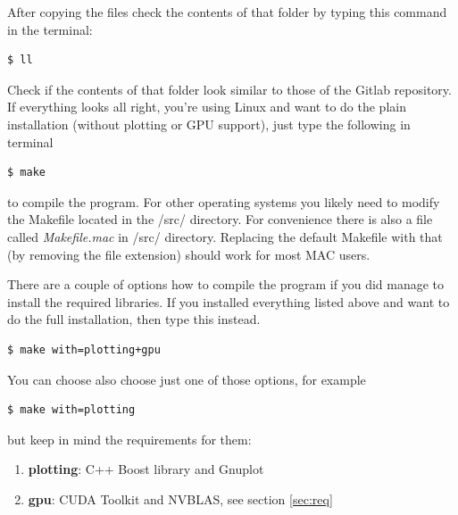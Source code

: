 \documentclass[english,12pt,a4paper,pdftex,sci,utf8]{aaltothesis}
\begin{document}
\noindent After copying the files check the contents of that folder by typing this command in the terminal:
\begin{verbatim}
$ ll
\end{verbatim}
Check if the contents of that folder look similar to those of the Gitlab repository. If everything looks all right, you're using Linux and want to do the plain installation (without plotting or GPU support), just type the following in terminal
\begin{verbatim}
$ make
\end{verbatim}
to compile the program. For other operating systems you likely need to modify the Makefile located in the /src/ directory. For convenience there is also a file called \textit{Makefile.mac} in /src/ directory. Replacing the default Makefile with that (by removing the file extension) should work for most MAC users. 
\par There are a couple of options how to compile the program if you did manage to install the required libraries. If you installed everything listed above and want to do the full installation, then type this instead.
\begin{verbatim}
$ make with=plotting+gpu
\end{verbatim}
You can choose also choose just one of those options, for example
\begin{verbatim}
$ make with=plotting
\end{verbatim} 
but keep in mind the requirements for them:
\begin{enumerate}
\item \textbf{plotting}: C++ Boost library and Gnuplot
\item \textbf{gpu}: CUDA Toolkit and NVBLAS, see section \ref{sec:req}
\end{enumerate}
\end{document}

